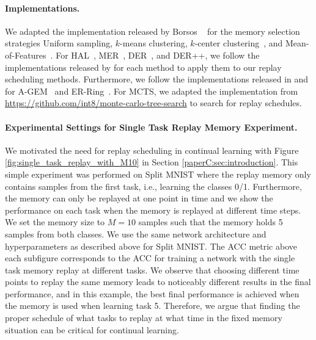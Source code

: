 \paragraph{Implementations.} We adapted the implementation released by Borsos \etal~ for the memory selection strategies Uniform sampling, $k$-means clustering, $k$-center clustering~, and Mean-of-Features~. For HAL~, MER~, DER~, and DER++, we follow the implementations released by  for each method to apply them to our replay scheduling methods. Furthermore, we follow the implementations released in  and  for A-GEM~ and ER-Ring~. For MCTS, we adapted the implementation from {\footnotesize \url{https://github.com/int8/monte-carlo-tree-search}} to search for replay schedules.

\vspace{-3mm}
\paragraph{Experimental Settings for Single Task Replay Memory Experiment.} We motivated the need for replay scheduling in continual learning with Figure \ref{fig:single_task_replay_with_M10} in Section \ref{paperC:sec:introduction}. This simple experiment was performed on Split MNIST where the replay memory only contains samples from the first task, i.e., learning the classes 0/1. Furthermore, the memory can only be replayed at one point in time and we show the performance on each task when the memory is replayed at different time steps. We set the memory size to $M=10$ samples such that the memory holds 5 samples from both classes. We use the same network architecture and hyperparameters as described above for Split MNIST. The ACC metric above each subfigure corresponds to the ACC for training a network with the single task memory replay at different tasks. We observe that choosing different time points to replay the same memory leads to noticeably different results in the final performance, and in this example, the best final performance is achieved when the memory is used when learning task 5. Therefore, we argue that finding the proper schedule of what tasks to replay at what time in the fixed memory situation can be critical for continual learning. 


